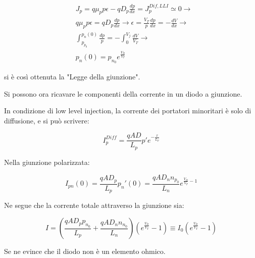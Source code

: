 \documentclass{article}
\begin{document}
\begin{equation}
    \begin{aligned}
         & J_p=q\mu_pp\epsilon-qD_p\frac{dp}{dx}=J_p^{Dif,LLI}\simeq 0 \rightarrow                                       \\
         & q\mu_pp\epsilon=qD_p\frac{dp}{dx} \rightarrow \epsilon= \frac{V_T}{p}\frac{dp}{dx}=-\frac{dV}{dx} \rightarrow \\
         & \int_{p_{p_0}}^{p_n(0)}\frac{dp}{p}=-\int_{0}^{V_j}\frac{dV}{V_T} \rightarrow                                 \\
         & p_n(0)=p_{n_0}e^{\frac{V_D}{V_T}}
    \end{aligned}
\end{equation}

si è così ottenuta la "Legge della giunzione".

Si possono ora ricavare le componenti della corrente in un diodo a giunzione.

In condizione di low level injection, la corrente dei portatori minoritari è solo di diffusione, e si può scrivere:

\begin{equation}
    I_p^{Diff}=\frac{qAD}{L_p}p'e^{-\frac{x}{L_p}}
\end{equation}

Nella giunzione polarizzata:

\begin{equation}
    I_{pn}(0)=\frac{qAD_p}{L_p}p_n'(0)=\frac{qAD_nn_{p_0}}{L_n}e^{\frac{V_D}{V_T}-1}
\end{equation}

Ne segue che la corrente totale attraverso la giunzione sia:

\begin{equation}
    I=(\frac{qAD_pp_{n_0}}{L_p}+\frac{qAD_nn_{n_0}}{L_n})(e^{\frac{V_D}{V_T}}-1)\equiv I_0(e^{\frac{V_D}{V_T}}-1)
\end{equation}

Se ne evince che il diodo non è un elemento ohmico.
\end{document}
